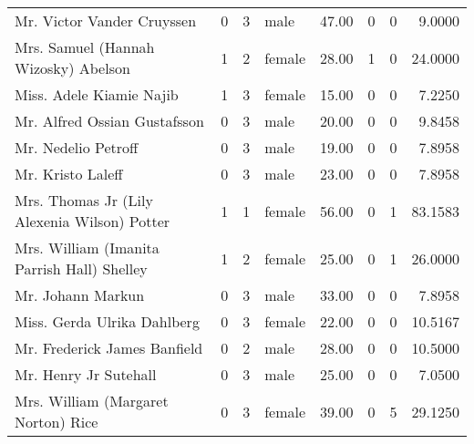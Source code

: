 \begin{tabular}{lrrlrrrr}
Mr. Victor Vander Cruyssen                         &         0 &       3 &    male &  47.00 &                        0 &                        0 &    9.0000 \\
Mrs. Samuel (Hannah Wizosky) Abelson               &         1 &       2 &  female &  28.00 &                        1 &                        0 &   24.0000 \\
Miss. Adele Kiamie Najib                           &         1 &       3 &  female &  15.00 &                        0 &                        0 &    7.2250 \\
Mr. Alfred Ossian Gustafsson                       &         0 &       3 &    male &  20.00 &                        0 &                        0 &    9.8458 \\
Mr. Nedelio Petroff                                &         0 &       3 &    male &  19.00 &                        0 &                        0 &    7.8958 \\
Mr. Kristo Laleff                                  &         0 &       3 &    male &  23.00 &                        0 &                        0 &    7.8958 \\
Mrs. Thomas Jr (Lily Alexenia Wilson) Potter       &         1 &       1 &  female &  56.00 &                        0 &                        1 &   83.1583 \\
Mrs. William (Imanita Parrish Hall) Shelley        &         1 &       2 &  female &  25.00 &                        0 &                        1 &   26.0000 \\
Mr. Johann Markun                                  &         0 &       3 &    male &  33.00 &                        0 &                        0 &    7.8958 \\
Miss. Gerda Ulrika Dahlberg                        &         0 &       3 &  female &  22.00 &                        0 &                        0 &   10.5167 \\
Mr. Frederick James Banfield                       &         0 &       2 &    male &  28.00 &                        0 &                        0 &   10.5000 \\
Mr. Henry Jr Sutehall                              &         0 &       3 &    male &  25.00 &                        0 &                        0 &    7.0500 \\
Mrs. William (Margaret Norton) Rice                &         0 &       3 &  female &  39.00 &                        0 &                        5 &   29.1250 \\

\end{tabular}

